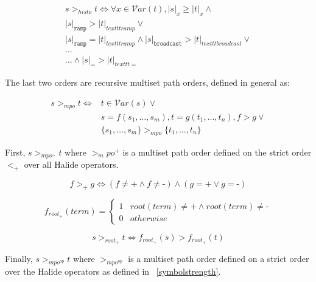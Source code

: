\documentclass[sigplan,10pt,review,anonymous]{acmart}\settopmatter{printfolios=true,printccs=false,printacmref=false}
\begin{document}
\begin{equation}
\begin{split}
s >_{histo} t \iff \forall x \in \mathcal{V}ar(t), |s|_x \geq |t|_x \wedge \\
|s|_{\texttt{ramp}} > |t|_{texttt{ramp}} \vee \\
|s|_{\texttt{ramp}} = |t|_{texttt{ramp}} \wedge |s|_{\texttt{broadcast}} > |t|_{texttt{broadcast}} \vee \\
\dots \\
\dots \wedge |s|_{\texttt{=}} > |t|_{texttt{=}} 
\end{split}
\end{equation}

The last two orders are recursive multiset path orders, defined in general as:

\begin{equation}
\begin{split}
s >_{mpo} t \iff & t \in \mathcal{V}ar(s) \vee \\
              &  s = f(s_1,\dots,s_m), t = g(t_1,...,t_n), f > g \vee \\
               & \{s_1, \dots, s_m\} >_{mpo} \{t_1,\dots,t_n\}
\end{split}
\end{equation}

First, $s >_{mpo^+} t$ where $>_mpo^+$ is a multiset path order defined on the strict order $<_+$ over all Halide operators.

\begin{equation}
f >_+ g \iff (f \neq \texttt{+} \wedge f \neq \texttt{-}) \wedge (g = \texttt{+} \vee g = \texttt{-})
\end{equation}

\[
f_{root_{\texttt{+}}}(term) = \begin{cases}
                          1 & root(term) \neq \texttt{+} \wedge root(term) \neq \texttt{-} \\
                          0 & otherwise
                          \end{cases}
\]

\begin{equation}
s >_{root_{\texttt{+}}} t \iff f_{root_{\texttt{+}}}(s) > f_{root_{\texttt{+}}}(t)
\end{equation}

Finally, $s >_{mpo^{op}} t$ where $>_{mpo^{op}}$ is a multiset path order defined on a strict order over the Halide operators as defined in ~\ref{symbolstrength}.
\end{document}
